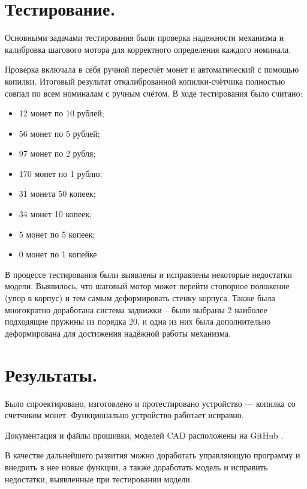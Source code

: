 \section {Тестирование.}

Основными задачами тестирования были проверка надежности механизма и калибровка шагового мотора для корректного определения каждого номинала.
\par\medskip

Проверка включала в себя ручной пересчёт монет и автоматический с помощью копилки. Итоговый результат откалиброванной копилки-счётчика полностью совпал по всем номиналам с ручным счётом. В ходе тестирования было считано:
\begin{itemize}
	\item 12 монет по 10 рублей;
	\item 56 монет по 5 рублей;
	\item 97 монет по 2 рубля;
	\item 170 монет по 1 рублю;
	\item 31 монета 50 копеек;
	\item 34 монет 10 копеек;
	\item 5 монет по 5 копеек;
	\item 0 монет по 1 копейке
\end{itemize}

В процессе тестирования были выявлены и исправлены некоторые недостатки модели. Выявилось, что шаговый мотор может перейти стопорное положение (упор в корпус) и тем самым деформировать стенку корпуса. Также была многократно доработана система задвижки -- были выбраны 2 наиболее подходящие пружины из порядка 20, и одна из них была дополнительно деформирована для достижения надёжной работы механизма.

\section {Результаты.}

Было спроектировано, изготовлено и протестировано устройство — копилка со счетчиком монет. Функционально устройство работает исправно. 
\par\medskip

Документация и файлы прошивки, моделей CAD расположены на GitHub \cite{github}.
\par\medskip

В качестве дальнейшего развития можно доработать управляющую программу и внедрить в нее новые функции, а также доработать модель и исправить недостатки, выявленные при тестировании модели.